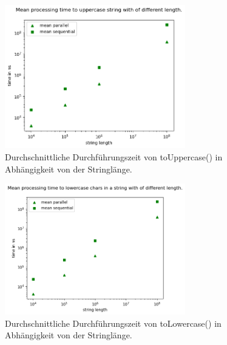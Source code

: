 \documentclass[plainarticle,zihtitle,german,final,hyperref,utf8]{zihpub}
\begin{document}
\begin{figure}[h]
	\begin{center}
		\includegraphics[width=0.7\textwidth]{images/complex_upper.png}
		\caption{Durchschnittliche Durchführungszeit von toUppercase() in Abhängigkeit von der Stringlänge.}
		\label{fig:mean_upper}
	\end{center}
\end{figure}

\begin{figure}[h]
	\begin{center}
		\includegraphics[width=0.7\textwidth]{images/complex_lower.png}
		\caption{Durchschnittliche Durchführungszeit von toLowercase() in Abhängigkeit von der Stringlänge.}
		\label{fig:mean_upper}
	\end{center}
\end{figure}
\end{document}
